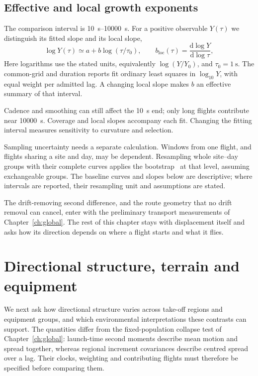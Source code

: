 \subsection{Effective and local growth exponents}
\label{sec:exponent}
\label{sec:transport-measure}

The comparison interval is \SIrange{10}{10000}{\second}. For a positive observable
$Y(\tau)$ we distinguish its fitted slope and its local slope,
\begin{equation}
  \log Y(\tau)\simeq a+b\log(\tau/\tau_0),
  \qquad b_{\mathrm{loc}}(\tau)=\frac{\mathrm d\log Y}{\mathrm d\log\tau},
  \label{eq:effective-slope}
\end{equation}
Here logarithms use the stated units, equivalently $\log(Y/Y_0)$, and
$\tau_0=\SI{1}{\second}$. The common-grid and duration reports fit ordinary least
squares in $\log_{10}Y$, with equal weight per admitted lag. A changing local slope
makes $b$ an effective summary of that interval.

Cadence and smoothing can still affect the \SI{10}{\second} end; only long flights
contribute near \SI{10000}{\second}. Coverage and local slopes accompany each fit.
Changing the fitting interval measures sensitivity to curvature and selection.

Sampling uncertainty needs a separate calculation. Windows from one flight, and
flights sharing a site and day, may be dependent. Resampling whole site--day groups
with their complete curves applies the bootstrap~\cite{efron1979} at that level,
assuming exchangeable groups. The baseline curves and slopes below are descriptive;
where intervals are reported, their resampling unit and assumptions are stated.


The drift-removing second difference, and the route geometry that no drift removal can
cancel, enter with the preliminary transport measurements of Chapter~\ref{ch:global}.
The rest of this chapter stays with displacement itself and asks how its direction
depends on where a flight starts and what it flies.

\FloatBarrier
\section{Directional structure, terrain and equipment}
\label{sec:transport-axisroutes}
\label{sec:transport-anisotropy}
\label{sec:transport-environment}

We next ask how directional structure varies across take-off regions and equipment
groups, and which environmental interpretations these contrasts can support.
The quantities differ from the fixed-population collapse test of
Chapter~\ref{ch:global}: launch-time
second moments describe mean motion and spread together, whereas regional
increment covariances describe centred spread over a lag. Their clocks, weighting
and contributing flights must therefore be specified before comparing them.

